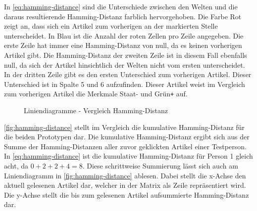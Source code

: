 In \autoref{eq:hamming-distance} sind die Unterschiede zwischen den Welten und die daraus resultierende Hamming-Distanz farblich hervorgehoben.
Die Farbe Rot zeigt an, dass sich ein Artikel zum vorherigen an der markierten Stelle unterscheidet.
In Blau ist die Anzahl der roten Zellen pro Zeile angegeben.
Die erste Zeile hat immer eine Hamming-Distanz von null, da es keinen vorherigen Artikel gibt.
Die Hamming-Distanz der zweiten Zeile ist in diesem Fall ebenfalls null, da sich der Artikel hinsichtlich der Welten nicht vom ersten unterscheidet.
In der dritten Zeile gibt es den ersten Unterschied zum vorherigen Artikel.
Dieser Unterschied ist in Spalte 5 und 6 aufzufinden.
Dieser Artikel weist im Vergleich zum vorherigen Artikel die Merkmale Staat- und Grün\texttt{+} auf.\\

\begin{figure}[ht!]
    \centering
    \qquad
    \caption{Liniendiagramme - Vergleich Hamming-Distanz}
    \label{fig:hamming-distance}
\end{figure}

\autoref{fig:hamming-distance} stellt im Vergleich die kumulative Hamming-Distanz für die beiden Prototypen dar.
Die kumulative Hamming-Distanz ergibt sich aus der Summe der Hamming-Distanzen aller zuvor geklickten Artikel einer Testperson.
In \autoref{eq:hamming-distance} ist die kumulative Hamming-Distanz für Person 1 gleich acht, da $0 + 2 + 2 + 4 = 8$.
Diese schrittweise Summierung lässt sich auch am Liniendiagramm in \autoref{fig:hamming-distance} ablesen.
Dabei stellt die x-Achse den aktuell gelesenen Artikel dar, welcher in der Matrix als Zeile repräsentiert wird.
Die y-Achse stellt die bis zum gelesenen Artikel aufsummierte Hamming-Distanz dar.\\


